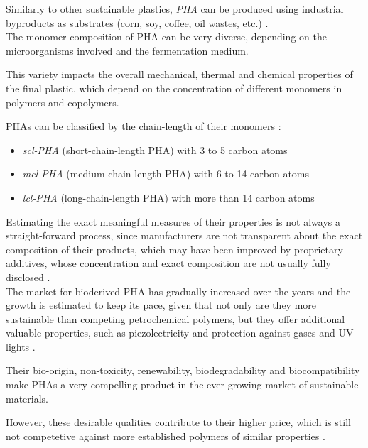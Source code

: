 \documentclass{article}
\begin{document}
    Similarly to other sustainable plastics, \textit{PHA} can be produced using industrial byproducts as substrates (corn, soy, coffee, oil wastes, etc.)
    \autocite{Kovalcik_PHA_Review}. \\ 

    The monomer composition of PHA can be very diverse, depending on the microorganisms involved and the fermentation medium. 
    
    This variety impacts the overall mechanical, thermal and chemical properties of the final plastic, which depend on the concentration of 
    different monomers in polymers and copolymers. 

    PHAs can be classified by the chain-length of their monomers \autocite*{Messori_Bondioli_PHAs}: 

    \begin{itemize}
        \item \textit{scl-PHA} (short-chain-length PHA) with 3 to 5 carbon atoms
        \item \textit{mcl-PHA} (medium-chain-length PHA) with 6 to 14 carbon atoms
        \item \textit{lcl-PHA} (long-chain-length PHA) with more than 14 carbon atoms
    \end{itemize}


    Estimating the exact meaningful measures of their properties is not always a straight-forward process, 
    since manufacturers are not transparent about the exact composition of their products, which may have been 
    improved by proprietary additives, whose concentration and exact composition are not usually fully disclosed \autocite{Kovalcik_PHA_Review}. \\ 
    
    The market for bioderived PHA has gradually increased over the years and the growth is estimated to keep its pace, given that not only are they more sustainable
    than competing petrochemical polymers, but they offer additional valuable properties, such as piezolectricity 
    and protection against gases and UV lights \autocite{Kovalcik_PHA_Review}.

    Their bio-origin, non-toxicity, renewability, biodegradability and biocompatibility make PHAs a very compelling product in the 
    ever growing market of sustainable materials. 

    However, these desirable qualities contribute to their higher price, which is still not competetive against more established 
    polymers of similar properties \autocite{Kovalcik_PHA_Review}. 
\end{document}
